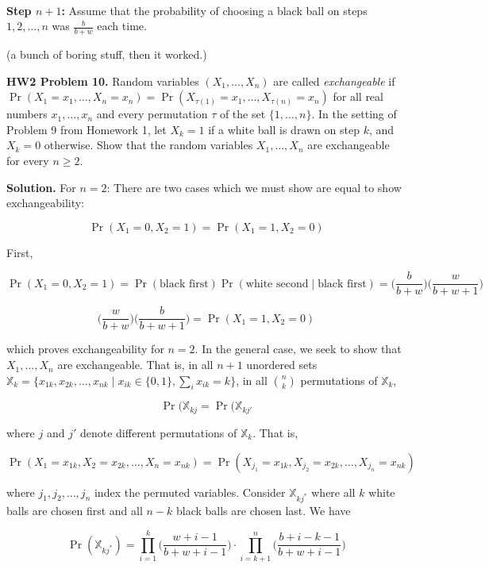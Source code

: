 \documentclass{article}
\begin{document}
\

\textbf{Step \(n + 1\):} Assume that the probability of choosing a black ball on steps \(1, 2, \dots, n\) was \( \frac{b}{b+w}\) each time.

(a bunch of boring stuff, then it worked.)

\textbf{HW2 Problem 10.} Random variables \((X_1, \ldots, X_n)\) are called \textit{exchangeable} if \(\Pr(X_1 = x_1, \ldots, X_n = x_n) = \Pr(X_{\tau(1)} = x_1, \ldots, X_{\tau(n)} = x_n) \) for all real numbers \(x_1, \ldots, x_n\) and every permutation \(\tau\) of the set \(\{1, \ldots, n\}\). In the setting of Problem 9 from Homework 1, let \(X_k = 1\) if a white ball is drawn on step \(k\), and \(X_k =0\) otherwise. Show that the random variables \(X_1, \ldots, X_n\) are exchangeable for every \(n \geq 2\).

\textbf{Solution.} For \(n =2\): There are two cases which we must show are equal to show exchangeability:

\[
\Pr(X_1 = 0, X_2 = 1) = \Pr(X_1 = 1, X_2 = 0)
\]

First,

\[
\Pr(X_1 = 0, X_2 = 1) = \Pr(\text{black first}) \Pr(\text{white second} \mid \text{black first}) = \bigg( \frac{b}{b+w}\bigg) \bigg( \frac{w}{b+w+1}\bigg)
\]

\[
\bigg( \frac{w}{b+w}\bigg) \bigg( \frac{b}{b+w+1}\bigg)= \Pr(X_1 = 1, X_2 = 0)
\]

which proves exchangeability for \(n=2\). In the general case, we seek to show that \(X_1, \ldots, X_n\) are exchangeable. That is, in all \(n +1\) unordered sets \(\mathbb{X}_k = \{x_{1k}, x_{2k}, \ldots, x_{nk} \mid x_{ik} \in \{0, 1\}, \sum_i x_{ik} = k\}\), in all \(\binom{n}{k}\) permutations of \(\mathbb{X}_k\), 

\[
\Pr(\mathbb{X}_{kj} = \Pr(\mathbb{X}_{kj'}
\]

where \(j\) and \(j'\) denote different permutations of \(\mathbb{X}_k\). That is,

\[
\Pr(X_1 = x_{1k}, X_2 = x_{2k}, \ldots, X_n = x_{nk}) = \Pr(X_{j_1} = x_{1k}, X_{j_2} = x_{2k}, \ldots, X_{j_n} = x_{nk})
\]

where \(j_1, j_2, \ldots, j_n\) index the permuted variables. Consider \(\mathbb{X}_{kj^*}\) where all \(k\) white balls are chosen first and all \(n -k\) black balls are chosen last. We have

\[
\Pr(\mathbb{X}_{kj^*}) = \prod_{i=1}^k \bigg( \frac{w+i-1}{b+w+i-1}\bigg) \cdot \prod_{i=k+1}^n \bigg( \frac{b+i-k-1}{b+w+i-1} \bigg) 
\]
\end{document}
